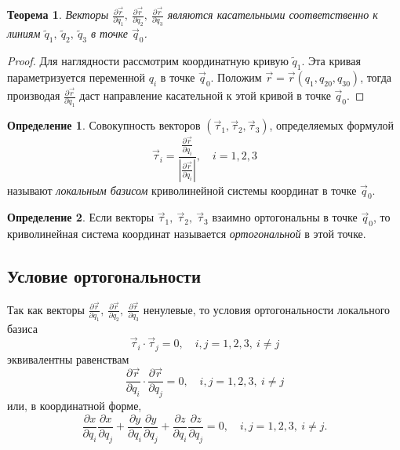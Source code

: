\documentclass{article}
\theoremstyle{definition}
\newtheorem{definition}{Определение}[section]
\theoremstyle{plain}
\newtheorem{theorem}{Теорема}[section]
\theoremstyle{remark}
\numberwithin{equation}{section}
\newcommand{\abs}[1]{\left|#1\right|}
\newcommand{\dotprod}[2]{#1 \cdot #2}
\newcommand{\parder}[2][]{\frac{\partial #1}{\partial #2}}
\begin{document}
\begin{theorem}
  Векторы $\parder[\vec{r}]{q_1},~\parder[\vec{r}]{q_2},~\parder[\vec{r}]{q_3}$
  являются касательными соответственно к линиям
  $\tilde{q}_1,~\tilde{q}_2,~\tilde{q}_3$ в точке $\vec{q}_0$.
\end{theorem}

\begin{proof}
  Для наглядности рассмотрим координатную кривую $\tilde{q}_1$. Эта кривая
  параметризуется переменной $q_i$ в точке $\vec{q}_0$. Положим
  $\vec{r} = \vec{r}(q_1, q_{20}, q_{30})$, тогда производая
  $\parder[\vec{r}]{q_1}$ даст направление касательной к этой кривой в точке
  $\vec{q}_0$.
\end{proof}

\begin{definition}
  Совокупность векторов $(\vec{\tau}_1, \vec{\tau}_2, \vec{\tau}_3)$,
  определяемых формулой
  \begin{equation*}
    \vec{\tau}_i = \frac{\parder[\vec{r}]{q_i}}{\abs{\parder[\vec{r}]{q_i}}},
      \quad i = 1,2,3
  \end{equation*}
  называют \textit{локальным базисом} криволинейной системы координат в точке
  $\vec{q}_0$.
\end{definition}

\begin{definition}
  Если векторы $\vec{\tau}_1,~\vec{\tau}_2,~\vec{\tau}_3$ взаимно ортогональны
  в точке $\vec{q}_0$, то криволинейная система координат называется
  \textit{ортогональной} в этой точке.
\end{definition}

\subsection{Условие ортогональности}

Так как векторы $\parder[\vec{r}]{q_1},~\parder[\vec{r}]{q_2},
~\parder[\vec{r}]{q_3}$ ненулевые, то условия ортогональности локального базиса
\begin{equation*}
  \dotprod{\vec{\tau}_i}{\vec{\tau}_j} = 0, \quad i,j = 1,2,3,~i \neq j
\end{equation*}
эквивалентны равенствам
\begin{equation*}
  \dotprod{\parder[\vec{r}]{q_i}}{\parder[\vec{r}]{q_j}} = 0,
    \quad i,j = 1,2,3,~i \neq j
\end{equation*}
или, в координатной форме,
\begin{equation}
  \parder[x]{q_i} \parder[x]{q_j} + \parder[y]{q_i} \parder[y]{q_j} +
    \parder[z]{q_i} \parder[z]{q_j} = 0, \quad i,j = 1,2,3,~i \neq j.
\end{equation}
\end{document}
